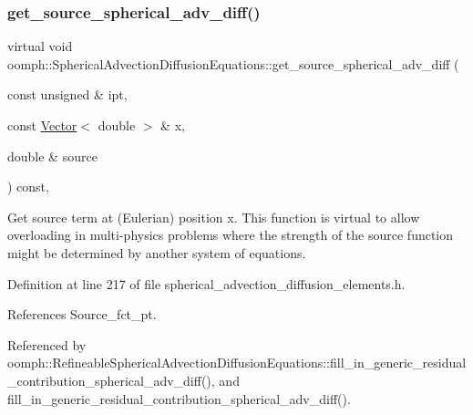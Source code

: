 \subsubsection{\texorpdfstring{get\+\_\+source\+\_\+spherical\+\_\+adv\+\_\+diff()}{get\_source\_spherical\_adv\_diff()}}
{\footnotesize\ttfamily virtual void oomph\+::\+Spherical\+Advection\+Diffusion\+Equations\+::get\+\_\+source\+\_\+spherical\+\_\+adv\+\_\+diff (\begin{DoxyParamCaption}\item[{const unsigned \&}]{ipt,  }\item[{const \hyperlink{classoomph_1_1Vector}{Vector}$<$ double $>$ \&}]{x,  }\item[{double \&}]{source }\end{DoxyParamCaption}) const\hspace{0.3cm}{\ttfamily [inline]}, {\ttfamily [virtual]}}



Get source term at (Eulerian) position x. This function is virtual to allow overloading in multi-\/physics problems where the strength of the source function might be determined by another system of equations. 



Definition at line 217 of file spherical\+\_\+advection\+\_\+diffusion\+\_\+elements.\+h.



References Source\+\_\+fct\+\_\+pt.



Referenced by oomph\+::\+Refineable\+Spherical\+Advection\+Diffusion\+Equations\+::fill\+\_\+in\+\_\+generic\+\_\+residual\+\_\+contribution\+\_\+spherical\+\_\+adv\+\_\+diff(), and fill\+\_\+in\+\_\+generic\+\_\+residual\+\_\+contribution\+\_\+spherical\+\_\+adv\+\_\+diff().

\mbox{\label{classoomph_1_1SphericalAdvectionDiffusionEquations_afbea24565ef0db2546b804233a114a86}} 
